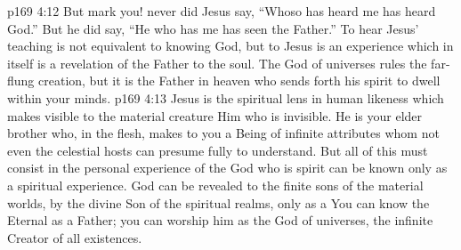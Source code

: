 \vs p169 4:12 But mark you! never did Jesus say, “Whoso has heard me has heard God.” But he did say, \textcolor{ubdarkred}{“He who has  me has seen the Father.”} To hear Jesus’ teaching is not equivalent to knowing God, but to  Jesus is an experience which in itself is a revelation of the Father to the soul. The God of universes rules the far\hyp{}flung creation, but it is the Father in heaven who sends forth his spirit to dwell within your minds.
\vs p169 4:13 Jesus is the spiritual lens in human likeness which makes visible to the material creature Him who is invisible. He is your elder brother who, in the flesh, makes  to you a Being of infinite attributes whom not even the celestial hosts can presume fully to understand. But all of this must consist in the personal experience of the  God who is spirit can be known only as a spiritual experience. God can be revealed to the finite sons of the material worlds, by the divine Son of the spiritual realms, only as a  You can know the Eternal as a Father; you can worship him as the God of universes, the infinite Creator of all existences.\plusone
